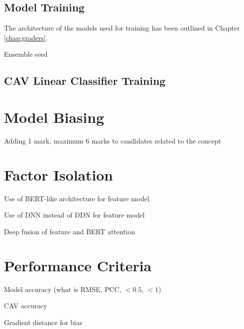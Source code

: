 \subsection{Model Training}
The architecture of the models used for training has been outlined in Chapter \ref{chap:graders}.

Ensemble seed

\subsection{CAV Linear Classifier Training}

\section{Model Biasing}

Adding 1 mark, maximum 6 marks to candidates related to the concept

\section{Factor Isolation}

Use of BERT-like architecture for feature model

Use of DNN instead of DDN for feature model

Deep fusion of feature and BERT attention

\section{Performance Criteria}
Model accuracy (what is RMSE, PCC, $<0.5$, $<1$)

CAV accuracy

Gradient distance for bias
